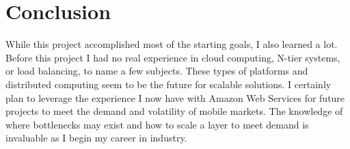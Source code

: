 \documentclass{article}
\begin{document}
\section{Conclusion}
While this project accomplished most of the starting goals, I also learned a lot. Before this project I had no real experience in cloud computing, N-tier systems, or load balancing, to name a few subjects. These types of platforms and distributed computing seem to be the future for scalable solutions. I certainly plan to leverage the experience I now have with Amazon Web Services for future projects to meet the demand and volatility of mobile markets. The knowledge of where bottlenecks may exist and how to scale a layer to meet demand is invaluable as I begin my career in industry.



\end{document}
